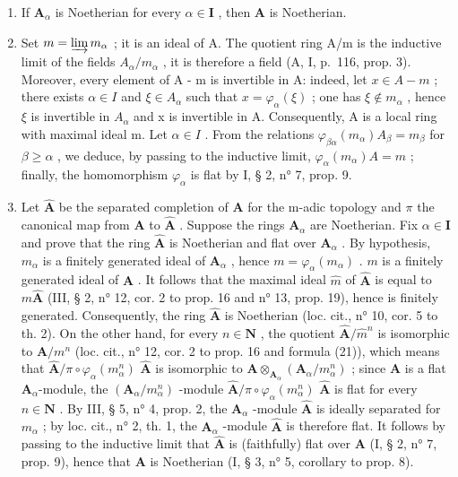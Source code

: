 \begin{enumerate}
\def\labelenumi{\alph{enumi})}
\setcounter{enumi}{1}
\item
  If \(\mathbf{A}_{\alpha}\) is Noetherian for every \(\alpha \in \mathbf{I}\) , then \(\mathbf{A}\) is Noetherian.
\item
  Set \(m = \varinjlim m_{\alpha}\) ; it is an ideal of A. The quotient ring A/m is the inductive limit of the fields \(A_{\alpha}/m_{\alpha}\) , it is therefore a field (A, I, p.~116, prop. 3). Moreover, every element of A - m is invertible in A: indeed, let \(x \in A - m\) ; there exists \(\alpha \in I\) and \(\xi \in A_{\alpha}\) such that \(x = \varphi_{\alpha}(\xi)\) ; one has \(\xi \notin m_{\alpha}\) , hence \(\xi\) is invertible in \(A_{\alpha}\) and x is invertible in A. Consequently, A is a local ring with maximal ideal m. Let \(\alpha \in I\) . From the relations \(\varphi_{\beta\alpha}(m_{\alpha}) A_{\beta} = m_{\beta}\) for \(\beta \geqslant \alpha\) , we deduce, by passing to the inductive limit, \(\varphi_{\alpha}(m_{\alpha}) A = m\) ; finally, the homomorphism \(\varphi_{\alpha}\) is flat by I, § 2, n° 7, prop. 9.
\item
  Let \(\hat{\mathbf{A}}\) be the separated completion of \(\mathbf{A}\) for the m-adic topology and \(\pi\) the canonical map from \(\mathbf{A}\) to \(\hat{\mathbf{A}}\) . Suppose the rings \(\mathbf{A}_{\alpha}\) are Noetherian. Fix \(\alpha \in \mathbf{I}\) and prove that the ring \(\hat{\mathbf{A}}\) is Noetherian and flat over \(\mathbf{A}_{\alpha}\) . By hypothesis, \(m_{\alpha}\) is a finitely generated ideal of \(\mathbf{A}_{\alpha}\) , hence \(m = \varphi_{\alpha}(m_{\alpha})\) . \(m\) is a finitely generated ideal of \(\mathbf{A}\) . It follows that the maximal ideal \(\hat{m}\) of \(\hat{\mathbf{A}}\) is equal to \(m\hat{\mathbf{A}}\) (III, § 2, n° 12, cor. 2 to prop. 16 and n° 13, prop. 19), hence is finitely generated. Consequently, the ring \(\hat{\mathbf{A}}\) is Noetherian (loc. cit., n° 10, cor. 5 to th. 2). On the other hand, for every \(n \in \mathbf{N}\) , the quotient \(\hat{\mathbf{A}}/\hat{m}^{n}\) is isomorphic to \(\mathbf{A}/m^{n}\) (loc. cit., n° 12, cor. 2 to prop. 16 and formula (21)), which means that \(\hat{\mathbf{A}}/\pi \circ \varphi_{\alpha}(m_{\alpha}^{n})\) \(\hat{\mathbf{A}}\) is isomorphic to \(\mathbf{A} \otimes_{\mathbf{A}_{\alpha}} (\mathbf{A}_{\alpha}/m_{\alpha}^{n})\) ; since \(\mathbf{A}\) is a flat \(\mathbf{A}_{\alpha}\)-module, the \((\mathbf{A}_{\alpha}/m_{\alpha}^{n})\) -module \(\hat{\mathbf{A}}/\pi \circ \varphi_{\alpha}(m_{\alpha}^{n})\) \(\hat{\mathbf{A}}\) is flat for every \(n \in \mathbf{N}\) . By III, § 5, n° 4, prop. 2, the \(\mathbf{A}_{\alpha}\) -module \(\hat{\mathbf{A}}\) is ideally separated for \(m_{\alpha}\) ; by loc. cit., n° 2, th. 1, the \(\mathbf{A}_{\alpha}\) -module \(\hat{\mathbf{A}}\) is therefore flat. It follows by passing to the inductive limit that \(\hat{\mathbf{A}}\) is (faithfully) flat over \(\mathbf{A}\) (I, § 2, n° 7, prop. 9), hence that \(\mathbf{A}\) is Noetherian (I, § 3, n° 5, corollary to prop. 8).
\end{enumerate}

